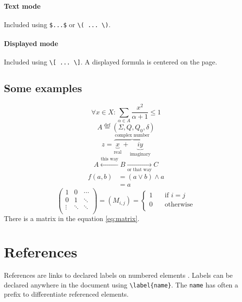 \paragraph{Text mode}
Included using \lstinline!$...$! or \lstinline$\( ... \)$.

\paragraph{Displayed mode}
Included using \lstinline$\[ ... \]$.
A displayed formula is centered on the page.

\subsection*{Some examples}
\[ \forall x \in X: \sum_{\alpha \in A} \frac{x^2}{\alpha + 1} \leq 1 \]
\[ A \overset{\textrm{def}}{=} (\Sigma, Q, Q_0, \delta) \]
\[ z = \overbrace{
	\underbrace{x}_\text{real} +
	\underbrace{iy}_\text{imaginary}
	}^\text{complex number}
\]
\[ A \xleftarrow{\text{this way}} B
	\xrightarrow[\text{or that way}]{} C \]
\begin{align*}
f(a, b)
	&= (a \vee b) \wedge a \\
	&= a
\end{align*}
\begin{equation}
\label{eq:matrix}
\begin{pmatrix}
1 & 0 & \cdots \\
0 & 1 & \ddots \\
\vdots & \ddots & \ddots \\
\end{pmatrix}
= (M_{i,j}) = \left\lbrace\begin{array}{cl}
1 & \quad \text{if $i = j$} \\
0 & \quad \text{otherwise} \\
\end{array}\right.
\end{equation}
There is a matrix in the equation \eqref{eq:matrix}.

\section{References}
\label{sec:ref}

References are links to declared labels on numbered elements .
Labels can be declared anywhere in the document using \lstinline$\label{name}$.
The \texttt{name} has often a prefix to differentiate referenced elements.


